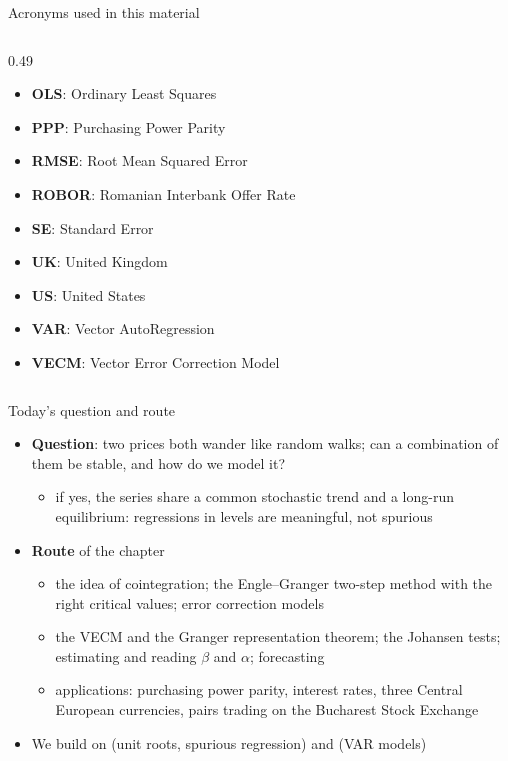 \begin{frame}{Acronyms used in this material}
\begin{columns}[T]
\begin{column}{0.49\textwidth}
\begin{itemize}
    \item \textbf{OLS}: Ordinary Least Squares
    \item \textbf{PPP}: Purchasing Power Parity
    \item \textbf{RMSE}: Root Mean Squared Error
    \item \textbf{ROBOR}: Romanian Interbank Offer Rate
    \item \textbf{SE}: Standard Error
    \item \textbf{UK}: United Kingdom
    \item \textbf{US}: United States
    \item \textbf{VAR}: Vector AutoRegression
    \item \textbf{VECM}: Vector Error Correction Model
\end{itemize}
\end{column}
\end{columns}
\end{frame}

\begin{frame}{Today's question and route}
\itemsize{\small}
\begin{itemize}
    \item \textbf{Question}: two prices both wander like random walks; can a combination of them be stable, and how do we model it?
    \begin{itemize}
        \item if yes, the series share a common stochastic trend and a long-run equilibrium: regressions in levels are meaningful, not spurious
    \end{itemize}
    \item \textbf{Route} of the chapter
    \begin{itemize}
        \item the idea of cointegration; the Engle--Granger two-step method with the right critical values; error correction models
        \item the VECM and the Granger representation theorem; the Johansen tests; estimating and reading $\beta$ and $\alpha$; forecasting
        \item applications: purchasing power parity, interest rates, three Central European currencies, pairs trading on the Bucharest Stock Exchange
    \end{itemize}
    \item We build on  (unit roots, spurious regression) and  (VAR models)
\end{itemize}
\end{frame}

